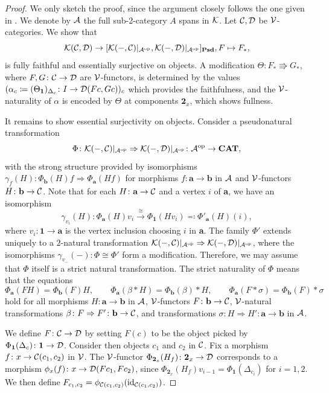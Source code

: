\begin{proof}
We only sketch the proof, since the argument closely follows the one given in \cite[Lemma~7.1]{hofstraInnerAutoequivalencesGeneral2024}. We denote by $\mathcal{A}$ the full sub-2-category $A$ spans in $\mathcal{K}$. Let $\mathcal{C},\mathcal{D}$ be $\mathcal{V}$-categories. We show that 
$$
\mathcal{K}(\mathcal{C},\mathcal{D})\to[\mathcal{K}(-,\mathcal{C})|_{\mathcal{A}^{\mathrm{op}}},\mathcal{K}(-,\mathcal{D})|_{\mathcal{A}^{\mathrm{op}}}]_{\mathbf{Psd}}, F\mapsto F_*,
$$
is fully faithful and essentially surjective on objects. A modification $\Theta\colon F_*\Rrightarrow G_*$, where $F,G\colon \mathcal{C}\to \mathcal{D}$ are $\mathcal{V}$-functors, is determined by the values $(\alpha_c\coloneqq (\Theta_\textbf{1})_{\Delta_c}\colon I\to \mathcal{D}(Fc,Gc))_c$ which provides the faithfulness, and the $\mathcal{V}$-naturality of $\alpha$ is encoded by $\Theta$ at components $\textbf{2}_x$, which shows fullness.

It remains to show essential surjectivity on objects. Consider a pseudonatural transformation 
$$
\Phi\colon \mathcal{K}(-,\mathcal{C})|_{\mathcal{A}^{\mathrm{op}}}\Rightarrow \mathcal{K}(-,\mathcal{D})|_{\mathcal{A}^{\mathrm{op}}}\colon \mathcal{A}^{\mathrm{op}}\to \mathbf{CAT},
$$
with the strong structure provided by isomorphisms $\gamma_f(H)\colon \Phi_\textbf{b}(H)f\Rightarrow \Phi_\textbf{a}(Hf)$ for morphisms $f\colon \textbf{a}\to \textbf{b}$ in $\mathcal{A}$ and $\mathcal{V}$-functors $H\colon \textbf{b}\to \mathcal{C}$. Note that for each $H\colon \textbf{a}\to \mathcal{C}$ and a vertex $i$ of \textbf{a}, we have an isomorphism 
$$
\gamma_{v_i}(H)\colon \Phi_\textbf{a}(H)v_i\xrightarrow{\cong} \Phi_\textbf{1}(Hv_i)\eqqcolon \Phi'_\textbf{a}(H)(i),
$$
where $v_i\colon \textbf{1}\to \textbf{a}$ is the vertex inclusion choosing $i$ in \textbf{a}. The family $\Phi'$ extends uniquely to a $2$-natural transformation $\mathcal{K}(-,\mathcal{C})|_{\mathcal{A}^{\mathrm{op}}}\Rightarrow \mathcal{K}(-,\mathcal{D})|_{\mathcal{A}^{\mathrm{op}}}$, where the isomorphisms $\gamma_{v_{-}}(-)\colon \Phi\cong \Phi'$ form a modification. Therefore, we may assume that $\Phi$ itself is a strict natural transformation. The strict naturality of $\Phi$ means that the equations
\begin{equation*}
\Phi_\textbf{a}(FH) = \Phi_\textbf{b}(F)H,\qquad \Phi_\textbf{a}(\beta * H) = \Phi_\textbf{b}(\beta) * H,\qquad \Phi_\textbf{a}(F * \sigma) = \Phi_\textbf{b}(F) * \sigma
\end{equation*}
hold for all morphisms $H\colon \textbf{a}\to \textbf{b}$ in $\mathcal{A}$, $\mathcal{V}$-functors $F\colon \textbf{b}\to \mathcal{C}$, $\mathcal{V}$-natural transformations $\beta\colon F\Rightarrow F'\colon \textbf{b}\to \mathcal{C}$, and transformations $\sigma\colon H\Rightarrow H'\colon \textbf{a}\to \textbf{b}$ in $\mathcal{A}$. 

We define $F\colon \mathcal{C}\to \mathcal{D}$ by setting $F(c)$ to be the object picked by $\Phi_\textbf{1}(\Delta_c)\colon \textbf{1}\to \mathcal{D}$. Consider then objects $c_1$ and $c_2$ in $\mathcal{C}$. Fix a morphism $f\colon x\to \mathcal{C}(c_1,c_2)$ in $\mathcal{V}$. The $\mathcal{V}$-functor $\Phi_{\textbf{2}_x}(H_f)\colon \textbf{2}_x\to \mathcal{D}$ corresponds to a morphism $\phi_x(f)\colon x\to \mathcal{D}(Fc_1,Fc_2)$, since $\Phi_{\textbf{2}_x}(H_f)v_{i-1} = \Phi_\textbf{1}(\Delta_{c_i})$ for $i = 1,2$. We then define $F_{c_1,c_2} = \phi_{\mathcal{C}(c_1,c_2)}(\mathrm{id}_{\mathcal{C}(c_1,c_2)})$. 


\end{proof}
